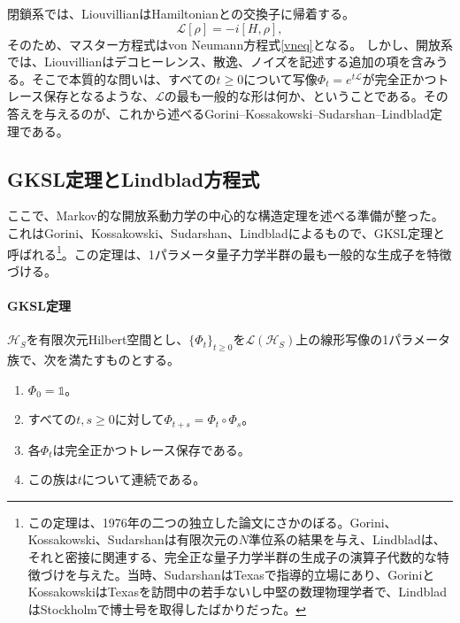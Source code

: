 \documentclass[a4paper,11pt,oneside]{article}
\theoremstyle{definition}
\numberwithin{equation}{section}
\begin{document}
閉鎖系では、LiouvillianはHamiltonianとの交換子に帰着する。
\begin{equation}
\mathcal L[\rho] = -i[H,\rho] ,
\end{equation}
そのため、マスター方程式はvon Neumann方程式\eqref{vneq}となる。
しかし、開放系では、Liouvillianはデコヒーレンス、散逸、ノイズを記述する追加の項を含みうる。そこで本質的な問いは、すべての$t\geq 0$について写像$\Phi_t=e^{t\mathcal L}$が完全正かつトレース保存となるような、$\mathcal L$の最も一般的な形は何か、ということである。その答えを与えるのが、これから述べるGorini--Kossakowski--Sudarshan--Lindblad定理である。






\subsection{GKSL定理とLindblad方程式}



ここで、Markov的な開放系動力学の中心的な構造定理を述べる準備が整った。これはGorini、Kossakowski、Sudarshan、Lindbladによるもので、GKSL定理と呼ばれる\footnote{この定理は、1976年の二つの独立した論文にさかのぼる。Gorini、Kossakowski、Sudarshan\cite{10.1063/1.522979}は有限次元の$N$準位系の結果を与え、Lindblad\cite{Lindblad:1975ef}は、それと密接に関連する、完全正な量子力学半群の生成子の演算子代数的な特徴づけを与えた。当時、SudarshanはTexasで指導的立場にあり、GoriniとKossakowskiはTexasを訪問中の若手ないし中堅の数理物理学者で、LindbladはStockholmで博士号を取得したばかりだった。}。この定理は、1パラメータ量子力学半群の最も一般的な生成子を特徴づける。



\paragraph{GKSL定理} $\mathcal H_S$を有限次元Hilbert空間とし、$\{\Phi_t\}_{t\geq 0}$を$\mathcal L(\mathcal H_S)$上の線形写像の1パラメータ族で、次を満たすものとする。



\begin{enumerate}
\item $\Phi_0=\mathds{1} $。
\item すべての$t,s\geq 0$に対して$\Phi_{t+s}=\Phi_t\circ \Phi_s$。
\item 各$\Phi_t$は完全正かつトレース保存である。
\item この族は$t$について連続である。
\end{enumerate}
\end{document}
